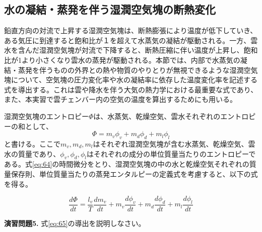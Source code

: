 \documentclass{ltjsarticle}
\begin{document}
\subsection{水の凝結・蒸発を伴う湿潤空気塊の断熱変化}
鉛直方向の対流で上昇する湿潤空気塊は、断熱膨張により温度が低下していき、ある気圧に到達すると飽和比が１を超えて水蒸気の凝結が駆動される。一方、雲水を含んだ湿潤空気塊が対流で下降すると、断熱圧縮に伴い温度が上昇し、飽和比が1より小さくなり雲水の蒸発が駆動される。本節では、内部で水蒸気の凝結・蒸発を伴うものの外界との熱や物質のやりとりが無視できるような湿潤空気塊について、空気塊の圧力変化率や水の凝結率に依存した温度変化率を記述する式を導出する。これは雲や降水を伴う大気の熱力学における最重要な式であり、また、本実習で雲チェンバー内の空気の温度を算出するためにも用いる。

湿潤空気塊のエントロピー$\Phi$は、水蒸気、乾燥空気、雲水それぞれのエントロピーの和として、
\begin{equation}\label{eq:64}
 \Phi = m_{v}\phi_{v}+m_{d}\phi_{d}+m_{l}\phi_{l}
\end{equation}
と書ける。ここで$m_{v}, m_{d}, m_{l}$はそれぞれ湿潤空気塊が含む水蒸気、乾燥空気、雲水の質量であり、$\phi_{v}, \phi_{d}, \phi_{l}$はそれぞれの成分の単位質量当たりのエントロピーである。式\eqref{eq:64}の時間微分をとり、湿潤空気塊の中の水と乾燥空気それぞれの質量保存則、単位質量当たりの蒸発エンタルピーの定義式を考慮すると、以下の式を得る。

\begin{equation}\label{eq:65}
 \frac{d\Phi}{dt} = \frac{l_{v}}{T}\frac{dm_{v}}{dt}+m_{v}\frac{d\phi_{v}}{dt}+m_{d}\frac{d\phi_{d}}{dt}+m_{l}\frac{d\phi_{l}}{dt}
\end{equation}


\begin{itembox}[l]{\bf{演習問題5.}}
式\eqref{eq:65}の導出を説明しなさい。
\end{itembox}
\\
\end{document}
